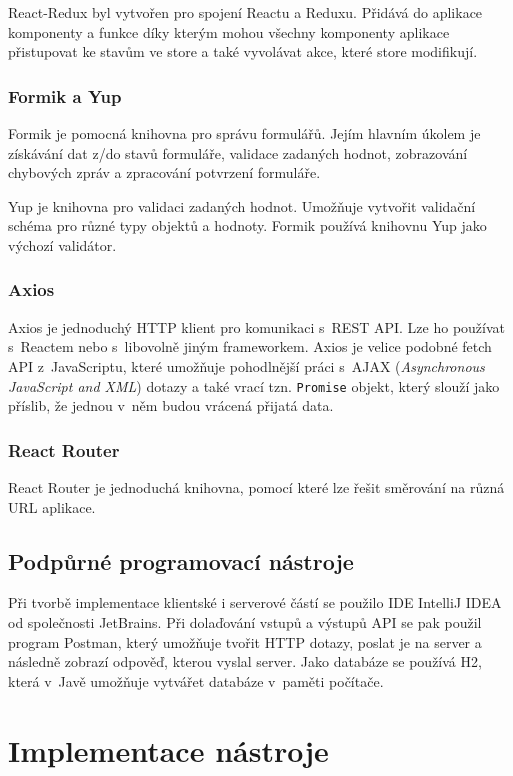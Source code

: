 React-Redux byl vytvořen pro spojení Reactu a Reduxu. Přidává do aplikace komponenty a funkce díky kterým mohou všechny komponenty aplikace přistupovat ke stavům ve store a také vyvolávat akce, které store modifikují.

\subsubsection *{Formik a Yup}

Formik je pomocná knihovna pro správu formulářů. Jejím hlavním úkolem je získávání dat z/do stavů formuláře, validace zadaných hodnot, zobrazování chybových zpráv a zpracování potvrzení formuláře. 

Yup je knihovna pro validaci zadaných hodnot. Umožňuje vytvořit validační schéma pro různé typy objektů a hodnoty. Formik používá knihovnu Yup jako výchozí validátor. 

\subsubsection *{Axios}

Axios je jednoduchý HTTP klient pro komunikaci s~REST API. Lze ho používat s~Reactem nebo s~libovolně jiným frameworkem. Axios je velice podobné fetch API z~JavaScriptu, které umožňuje pohodlnější práci s~AJAX (\textit{Asynchronous JavaScript and XML}) dotazy a také vrací tzn. \texttt{Promise} objekt, který slouží jako příslib, že jednou v~něm budou vrácená přijatá data.

\subsubsection *{React Router}

React Router je jednoduchá knihovna, pomocí které lze řešit směrování na různá URL aplikace.

\subsection{Podpůrné programovací nástroje}

Při tvorbě implementace klientské i serverové částí se použilo IDE IntelliJ IDEA od společnosti JetBrains.
Při dolaďování vstupů a výstupů API se pak použil program Postman, který umožňuje tvořit HTTP dotazy, poslat je na server a následně zobrazí odpověď, kterou vyslal server. Jako databáze se používá H2, která v~Javě umožňuje vytvářet databáze v~paměti počítače.


\section{Implementace nástroje}

